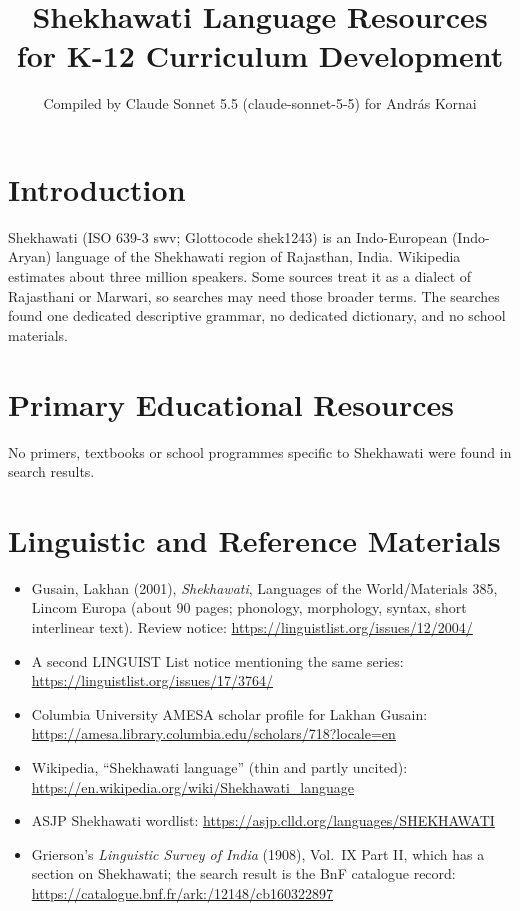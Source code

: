 \documentclass[12pt]{article}
\title{Shekhawati Language Resources for K-12 Curriculum Development}
\author{Compiled by Claude Sonnet 5.5 (claude-sonnet-5-5) for Andr\'as Kornai}
\date{}
\begin{document}
\maketitle

\section{Introduction}
Shekhawati (ISO 639-3 swv; Glottocode shek1243) is an Indo-European (Indo-Aryan) language of the Shekhawati region of Rajasthan, India. Wikipedia estimates about three million speakers. Some sources treat it as a dialect of Rajasthani or Marwari, so searches may need those broader terms. The searches found one dedicated descriptive grammar, no dedicated dictionary, and no school materials.

\section{Primary Educational Resources}
No primers, textbooks or school programmes specific to Shekhawati were found in search results.

\section{Linguistic and Reference Materials}
\begin{itemize}
\item Gusain, Lakhan (2001), \emph{Shekhawati}, Languages of the World/Materials 385, Lincom Europa (about 90 pages; phonology, morphology, syntax, short interlinear text). Review notice: \url{https://linguistlist.org/issues/12/2004/}
\item A second LINGUIST List notice mentioning the same series: \url{https://linguistlist.org/issues/17/3764/}
\item Columbia University AMESA scholar profile for Lakhan Gusain: \url{https://amesa.library.columbia.edu/scholars/718?locale=en}
\item Wikipedia, ``Shekhawati language'' (thin and partly uncited): \url{https://en.wikipedia.org/wiki/Shekhawati_language}
\item ASJP Shekhawati wordlist: \url{https://asjp.clld.org/languages/SHEKHAWATI}
\item Grierson's \emph{Linguistic Survey of India} (1908), Vol.\ IX Part II, which has a section on Shekhawati; the search result is the BnF catalogue record: \url{https://catalogue.bnf.fr/ark:/12148/cb160322897}
\end{itemize}
\end{document}
